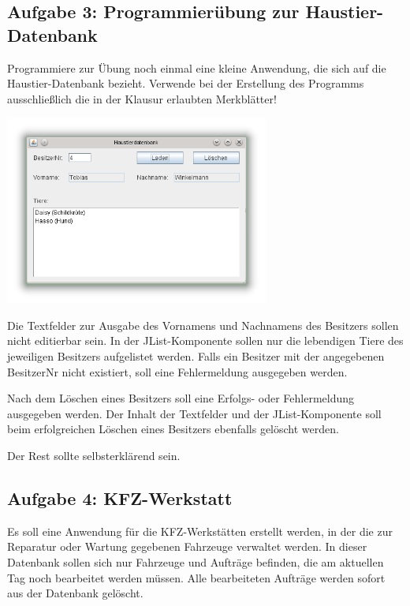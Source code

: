 \subsection{Aufgabe 3: Programmierübung zur Haustier-Datenbank}

Programmiere zur Übung noch einmal eine kleine Anwendung, die sich auf die
Haustier-Datenbank bezieht. Verwende bei der Erstellung des Programms
ausschließlich die in der Klausur erlaubten Merkblätter!

\begin{center}
\includegraphics[width=0.65\textwidth]{./inf/SEKII/38_JavaSQL_Wiederholung/HaustierdatenbankAufgabe3.png}
\end{center}

Die Textfelder zur Ausgabe des Vornamens und Nachnamens des Besitzers sollen
nicht editierbar sein. In der JList-Komponente sollen nur die lebendigen Tiere
des jeweiligen Besitzers aufgelistet werden. Falls ein Besitzer mit der
angegebenen BesitzerNr nicht existiert, soll eine Fehlermeldung ausgegeben
werden.

Nach dem Löschen eines Besitzers soll eine Erfolgs- oder Fehlermeldung
ausgegeben werden. Der Inhalt der Textfelder und der JList-Komponente soll beim
erfolgreichen Löschen eines Besitzers ebenfalls gelöscht werden.

Der Rest sollte selbsterklärend sein.


\subsection{Aufgabe 4: KFZ-Werkstatt}

Es soll eine Anwendung für die KFZ-Werkstätten erstellt werden, in der die zur
Reparatur oder Wartung gegebenen Fahrzeuge verwaltet werden. In dieser Datenbank
sollen sich nur Fahrzeuge und Aufträge befinden, die am aktuellen Tag noch
bearbeitet werden müssen. Alle bearbeiteten Aufträge werden sofort aus der
Datenbank gelöscht.

